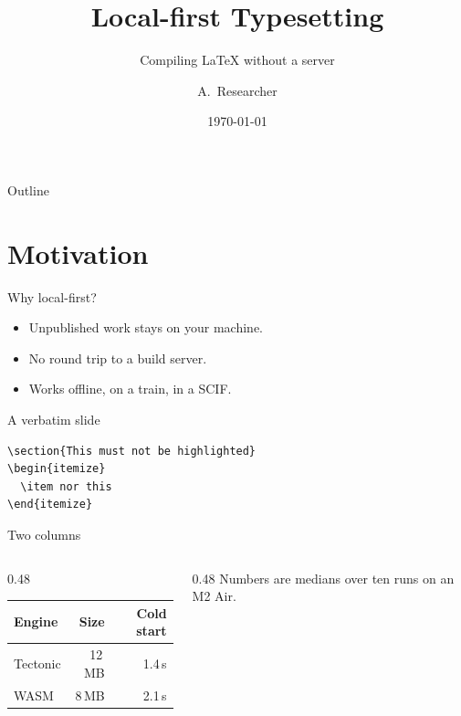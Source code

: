 \documentclass[aspectratio=169]{beamer}
\title{Local-first Typesetting}
\subtitle{Compiling \LaTeX{} without a server}
\author{A.\ Researcher}
\institute{Department of Computer Science}
\date{\today}
\begin{document}
\begin{frame}
  \titlepage
\end{frame}

\begin{frame}{Outline}
  \tableofcontents
\end{frame}

\section{Motivation}

\begin{frame}{Why local-first?}
  \begin{itemize}
    \item<1-> Unpublished work stays on your machine.
    \item<2-> No round trip to a build server.
    \item<3-> Works offline, on a train, in a SCIF.
  \end{itemize}

\end{frame}

\begin{frame}[fragile]{A verbatim slide}
\begin{verbatim}
\section{This must not be highlighted}
\begin{itemize}
  \item nor this
\end{itemize}
\end{verbatim}
\end{frame}

\begin{frame}{Two columns}
  \begin{columns}[T]
    \begin{column}{0.48\textwidth}
      \begin{table}
        \centering
        \begin{tabular}{lrr}
          \toprule
          Engine & Size & Cold start \\
          \midrule
          Tectonic & 12\,MB & 1.4\,s \\
          WASM     & 8\,MB  & 2.1\,s \\
          \bottomrule
        \end{tabular}
      \end{table}
    \end{column}
    \begin{column}{0.48\textwidth}
      Numbers are medians over ten runs on an M2 Air.
    \end{column}
  \end{columns}
\end{frame}
\end{document}
